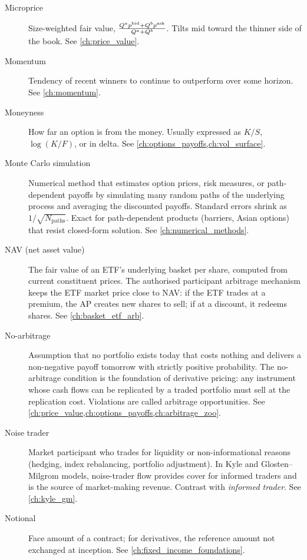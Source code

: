 \begin{description}
\item[Microprice]
Size-weighted fair value, $\frac{Q^a p^{\mathrm{bid}} + Q^b p^{\mathrm{ask}}}{Q^a + Q^b}$.
Tilts mid toward the thinner side of the book. See \cref{ch:price_value}.

\item[Momentum]
Tendency of recent winners to continue to outperform over some horizon.
See \cref{ch:momentum}.

\item[Moneyness]
How far an option is from the money. Usually expressed as $K/S$,
$\log(K/F)$, or in delta. See \cref{ch:options_payoffs,ch:vol_surface}.

\item[Monte Carlo simulation]
Numerical method that estimates option prices, risk measures, or path-dependent
payoffs by simulating many random paths of the underlying process and
averaging the discounted payoffs. Standard errors shrink as
$1/\sqrt{N_{\text{paths}}}$. Exact for path-dependent products
(barriers, Asian options) that resist closed-form solution.
See \cref{ch:numerical_methods}.

\item[NAV (net asset value)]
The fair value of an ETF's underlying basket per share, computed from
current constituent prices. The authorised participant arbitrage mechanism
keeps the ETF market price close to NAV: if the ETF trades at a premium,
the AP creates new shares to sell; if at a discount, it redeems shares.
See \cref{ch:basket_etf_arb}.

\item[No-arbitrage]
Assumption that no portfolio exists today that costs nothing and delivers
a non-negative payoff tomorrow with strictly positive probability. The
no-arbitrage condition is the foundation of derivative pricing: any
instrument whose cash flows can be replicated by a traded portfolio must
sell at the replication cost. Violations are called arbitrage opportunities.
See \cref{ch:price_value,ch:options_payoffs,ch:arbitrage_zoo}.

\item[Noise trader]
Market participant who trades for liquidity or non-informational reasons
(hedging, index rebalancing, portfolio adjustment). In Kyle and
Glosten--Milgrom models, noise-trader flow provides cover for informed
traders and is the source of market-making revenue. Contrast with
\emph{informed trader}. See \cref{ch:kyle_gm}.

\item[Notional]
Face amount of a contract; for derivatives, the reference amount not
exchanged at inception. See \cref{ch:fixed_income_foundations}.


\end{description}
